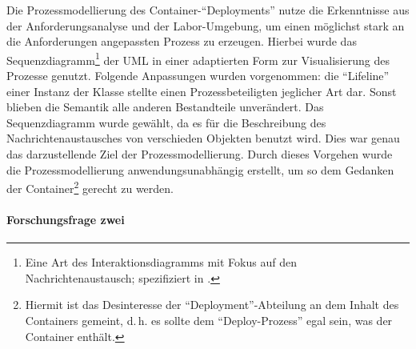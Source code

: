 Die Prozessmodellierung des Container-\enquote{Deployments} nutze die Erkenntnisse aus der Anforderungsanalyse und der Labor-Umgebung, um einen möglichst stark an die Anforderungen angepassten Prozess zu erzeugen. Hierbei wurde das Sequenzdiagramm\footnote{Eine Art des Interaktionsdiagramms mit Fokus auf den Nachrichtenaustausch; spezifiziert in \cite[][S.\,595-599]{object_management_group_omg_unified_2017}.} der \ac{UML} in einer adaptierten Form zur Visualisierung des Prozesse genutzt. Folgende Anpassungen wurden vorgenommen: die \enquote{Lifeline} einer Instanz der Klasse stellte einen Prozessbeteiligten jeglicher Art dar. Sonst blieben die Semantik alle anderen Bestandteile unverändert. Das Sequenzdiagramm wurde gewählt, da es für die Beschreibung des Nachrichtenaustausches von verschieden Objekten benutzt wird. Dies war genau das darzustellende Ziel der Prozessmodellierung. Durch dieses Vorgehen wurde die Prozessmodellierung anwendungsunabhängig erstellt, um so dem Gedanken der Container\footnote{Hiermit ist das Desinteresse der \enquote{Deployment}-Abteilung an dem Inhalt des Containers gemeint, d.\,h. es sollte dem  \enquote{Deploy-Prozess} egal sein, was der Container enthält.} gerecht zu werden. 

\paragraph{Forschungsfrage zwei}

